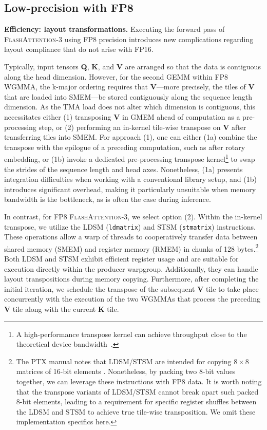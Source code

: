 \begin{algorithm}[H]
\begin{algorithmic}[1]
\subsection{Low-precision with FP8}
\label{sec:algofp8}

\textbf{Efficiency: layout transformations.} Executing the forward pass of \textsc{FlashAttention-3} using FP8 precision introduces new complications regarding layout compliance that do not arise with FP16.

Typically, input tensors $\mathbf{Q}$, $\mathbf{K}$, and $\mathbf{V}$ are arranged so that the data is contiguous along the head dimension. However, for the second GEMM within FP8 WGMMA, the k-major ordering requires that $\mathbf{V}$—more precisely, the tiles of $\mathbf{V}$ that are loaded into SMEM—be stored contiguously along the sequence length dimension. As the TMA load does not alter which dimension is contiguous, this necessitates either (1) transposing $\mathbf{V}$ in GMEM ahead of computation as a pre-processing step, or (2) performing an in-kernel tile-wise transpose on $\mathbf{V}$ after transferring tiles into SMEM. For approach (1), one can either (1a) combine the transpose with the epilogue of a preceding computation, such as after rotary embedding, or (1b) invoke a dedicated pre-processing transpose kernel\footnote{A high-performance transpose kernel can achieve throughput close to the theoretical device bandwidth~\citep{colfax_cutlass_transpose_2024}.} to swap the strides of the sequence length and head axes. Nonetheless, (1a) presents integration difficulties when working with a conventional library setup, and (1b) introduces significant overhead, making it particularly unsuitable when memory bandwidth is the bottleneck, as is often the case during inference.

In contrast, for FP8 \textsc{FlashAttention-3}, we select option (2). Within the in-kernel transpose, we utilize the LDSM (\verb|ldmatrix|) and STSM (\verb|stmatrix|) instructions. These operations allow a warp of threads to cooperatively transfer data between shared memory (SMEM) and register memory (RMEM) in chunks of 128 bytes.\footnote{The PTX manual notes that LDSM/STSM are intended for copying $8 \times 8$ matrices of 16-bit elements \cite[\S 9.7.13.4.15-16]{ptx}. Nonetheless, by packing two 8-bit values together, we can leverage these instructions with FP8 data. It is worth noting that the transpose variants of LDSM/STSM cannot break apart such packed 8-bit elements, leading to a requirement for specific register shuffles between the LDSM and STSM to achieve true tile-wise transposition. We omit these implementation specifics here.} Both LDSM and STSM exhibit efficient register usage and are suitable for execution directly within the producer warpgroup. Additionally, they can handle layout transpositions during memory copying. Furthermore, after completing the initial iteration, we schedule the transpose of the subsequent $\mathbf{V}$ tile to take place concurrently with the execution of the two WGMMAs that process the preceding $\mathbf{V}$ tile along with the current $\mathbf{K}$ tile.


\end{algorithmic}
\end{algorithm}
